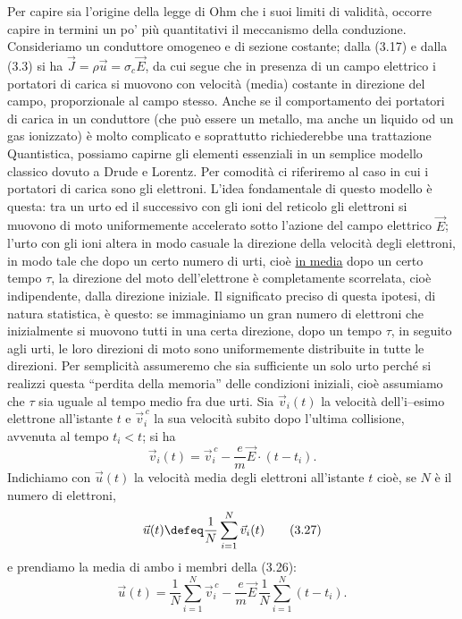 Per capire sia l'origine della legge di Ohm che i suoi limiti di validit\`a,
occorre capire in termini un po' pi\`u quantitativi il meccanismo della
conduzione. Consideriamo un conduttore omogeneo e di sezione costante; dalla
(3.17) e dalla (3.3) si ha $\vec J=\rho\vec u=\sigma_c\vec E$, da cui segue che
in presenza di un campo elettrico i portatori di carica si muovono con
velocit\`a (media) costante in direzione del campo, proporzionale al campo
stesso. Anche se il comportamento dei portatori di carica in un conduttore (che
pu\`o essere un metallo, ma anche un liquido od un gas ionizzato) \`e molto
complicato e soprattutto richiederebbe una trattazione Quantistica, possiamo
capirne gli elementi essenziali in un semplice modello classico dovuto a Drude e
Lorentz. Per comodit\`a ci riferiremo al caso in cui i portatori di carica sono
gli elettroni. L'idea fondamentale di questo modello \`e questa: tra un urto ed
il successivo con gli ioni del reticolo gli elettroni si muovono di moto
uniformemente accelerato sotto l'azione del campo elettrico $\vec E$; l'urto con
gli ioni altera in modo casuale la direzione della velocit\`a degli elettroni,
in modo tale che dopo un certo numero di urti, cio\`e \underline{in media} dopo
un certo tempo $\tau$, la direzione del moto dell'elettrone \`e completamente
scorrelata, cio\`e indipendente, dalla direzione iniziale. Il significato
preciso di questa ipotesi, di natura statistica, \`e questo: se immaginiamo un
gran numero di elettroni che inizialmente si muovono tutti in una certa
direzione, dopo un tempo $\tau$, in seguito agli urti, le loro direzioni di moto
sono uniformemente distribuite in tutte le direzioni. Per semplicit\`a
assumeremo che sia sufficiente un solo urto perch\'e si realizzi questa
``perdita della memoria'' delle condizioni iniziali, cio\`e assumiamo che $\tau$
sia uguale al tempo medio fra due urti. Sia $\vec v_i(t)$ la velocit\`a
dell'i--esimo elettrone all'istante $t$ e $\vec v_i^{\,c}$ la sua velocit\`a
subito dopo l'ultima collisione, avvenuta al tempo $t_i<t$; si ha
\begin{equation}
  \vec v_i(t)=\vec v_i^{\,c}-\frac em\vec E\cdot(t-t_i).
  \tag{3.26}
\end{equation}
Indichiamo con $\vec u(t)$ la velocit\`a media degli elettroni all'istante $t$
cio\`e, se $N$ \`e il numero di elettroni,
\begin{equation}
  \vec u(t)\defeq\frac1N\sum_{i=1}^N\vec v_i(t)
  \tag{3.27}
\end{equation}
e prendiamo la media di ambo i membri della (3.26):
\begin{equation}
  \vec u(t)=\frac1N\sum_{i=1}^N\vec v_i^{\,c}
  -\frac em\vec E\,\frac1N\sum_{i=1}^N(t-t_i).
  \tag{3.28}
\end{equation}
